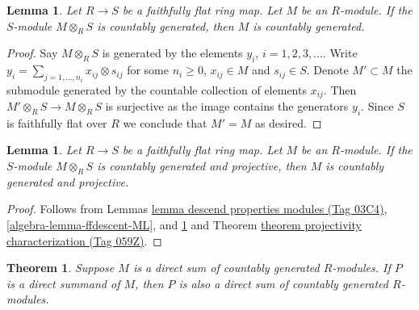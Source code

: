 \documentclass{amsart}
\theoremstyle{plain}
\newtheorem{theorem}[subsection]{Theorem}
\newtheorem{lemma}[subsection]{Lemma}
\theoremstyle{definition}
\theoremstyle{remark}
\numberwithin{equation}{subsection}
\begin{document}
\begin{lemma}
\label{algebra-lemma-ffdescent-countable}
Let $R \to S$ be a faithfully flat ring map. Let $M$ be an $R$-module. If
the $S$-module $M \otimes_R S$ is countably generated, then $M$
is countably generated.
\end{lemma}

\begin{proof}
Say $M \otimes_R S$ is generated by the elements
$y_i$, $i = 1, 2, 3, \ldots$. Write $y_i = \sum_{j = 1, \ldots, n_i}
x_{ij} \otimes s_{ij}$ for some $n_i \geq 0$, $x_{ij} \in M$
and $s_{ij} \in S$. Denote $M' \subset M$ the submodule generated
by the countable collection of elements $x_{ij}$. Then
$M' \otimes_R S \to M \otimes_R S$ is surjective as the
image contains the generators $y_i$. Since $S$ is faithfully flat
over $R$ we conclude that $M' = M$ as desired.
\end{proof}


\begin{lemma}
\label{algebra-lemma-ffdescent-countable-projectivity}
Let $R \to S$ be a faithfully flat ring map.  Let $M$ be an $R$-module.
 If the $S$-module $M \otimes_R S$ is countably generated and projective,
then $M$ is countably generated and projective.
\end{lemma}

\begin{proof}
Follows from Lemmas \href{https://stacks.math.columbia.edu/tag/03C4}{lemma descend properties modules (Tag 03C4)},
\ref{algebra-lemma-ffdescent-ML}, and \ref{algebra-lemma-ffdescent-countable} and
Theorem \href{https://stacks.math.columbia.edu/tag/059Z}{theorem projectivity characterization (Tag 059Z)}.
\end{proof}


\begin{theorem}
\label{algebra-theorem-kaplansky-direct-sum}
Suppose $M$ is a direct sum of countably generated $R$-modules.  If $P$ is a
direct summand of $M$, then $P$ is also a direct sum of countably generated
$R$-modules.
\end{theorem}
\end{document}
